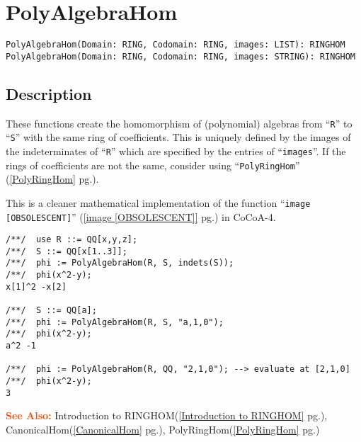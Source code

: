 \documentclass[a4paper]{mybook}
\newenvironment{command}{}{} %
\newcommand\SeeAlso{\par\textcolor{OrangeRed}{\textbf{\large See Also: }}}
\begin{document}
\section{PolyAlgebraHom}
\label{PolyAlgebraHom}
\begin{command} %


\begin{Verbatim}[label=syntax, rulecolor=\color{MidnightBlue},
frame=single]
PolyAlgebraHom(Domain: RING, Codomain: RING, images: LIST): RINGHOM
PolyAlgebraHom(Domain: RING, Codomain: RING, images: STRING): RINGHOM
\end{Verbatim}


\subsection*{Description}

These functions create the homomorphism of (polynomial) algebras from
``\verb&R&'' to ``\verb&S&'' with the same ring of coefficients.  This is
uniquely defined by the images of the indeterminates of ``\verb&R&'' which
are specified by the entries of ``\verb&images&''.  If the rings of coefficients
are not the same, consider using ``\verb&PolyRingHom&'' (\ref{PolyRingHom} pg.\pageref{PolyRingHom}).
\par 
This is a cleaner mathematical implementation of the function
``\verb&image [OBSOLESCENT]&'' (\ref{image [OBSOLESCENT]} pg.\pageref{image [OBSOLESCENT]}) in CoCoA-4.
\begin{Verbatim}[label=example, rulecolor=\color{PineGreen}, frame=single]
/**/  use R ::= QQ[x,y,z];
/**/  S ::= QQ[x[1..3]];
/**/  phi := PolyAlgebraHom(R, S, indets(S));
/**/  phi(x^2-y);
x[1]^2 -x[2]

/**/  S ::= QQ[a];
/**/  phi := PolyAlgebraHom(R, S, "a,1,0");
/**/  phi(x^2-y);
a^2 -1

/**/  phi := PolyAlgebraHom(R, QQ, "2,1,0"); --> evaluate at [2,1,0]
/**/  phi(x^2-y);
3
\end{Verbatim}


\SeeAlso %
  Introduction to RINGHOM(\ref{Introduction to RINGHOM} pg.\pageref{Introduction to RINGHOM}), 
    CanonicalHom(\ref{CanonicalHom} pg.\pageref{CanonicalHom}), 
    PolyRingHom(\ref{PolyRingHom} pg.\pageref{PolyRingHom})
\end{command} %
\end{document}
